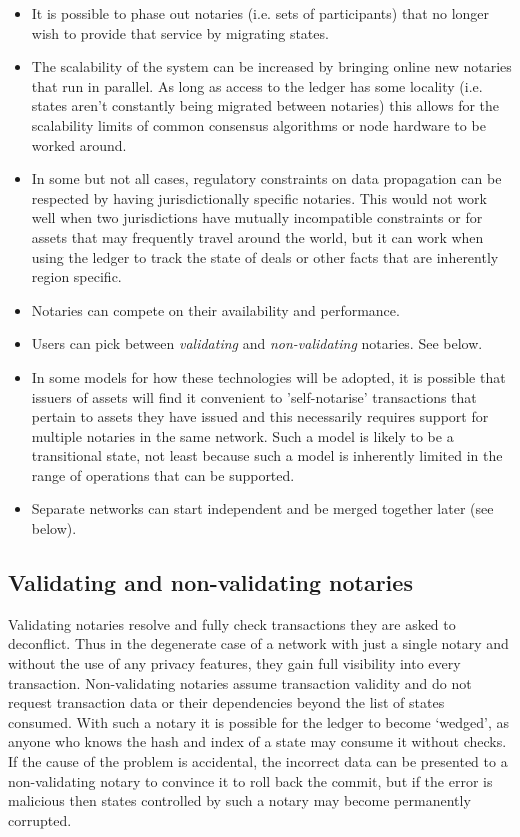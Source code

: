 \documentclass{article}
\begin{document}
\begin{itemize}
\item It is possible to phase out notaries (i.e. sets of participants) that no longer wish to provide that service by
migrating states.
\item The scalability of the system can be increased by bringing online new notaries that run in parallel. As long
as access to the ledger has some locality (i.e. states aren't constantly being migrated between notaries) this
allows for the scalability limits of common consensus algorithms or node hardware to be worked around.
\item In some but not all cases, regulatory constraints on data propagation can be respected by having
jurisdictionally specific notaries. This would not work well when two jurisdictions have mutually incompatible
constraints or for assets that may frequently travel around the world, but it can work when using the ledger to
track the state of deals or other facts that are inherently region specific.
\item Notaries can compete on their availability and performance.
\item Users can pick between \emph{validating} and \emph{non-validating} notaries. See below.
\item In some models for how these technologies will be adopted, it is possible that issuers of assets will find it
convenient to 'self-notarise' transactions that pertain to assets they have issued and this necessarily requires
support for multiple notaries in the same network. Such a model is likely to be a transitional state, not least
because such a model is inherently limited in the range of operations that can be supported.
\item Separate networks can start independent and be merged together later (see below).
\end{itemize}

\subsection{Validating and non-validating notaries}\label{sec:non-validating-notaries}

Validating notaries resolve and fully check transactions they are asked to deconflict. Thus in the degenerate case
of a network with just a single notary and without the use of any privacy features, they gain full visibility into
every transaction. Non-validating notaries assume transaction validity and do not request transaction data or their
dependencies beyond the list of states consumed. With such a notary it is possible for the ledger to become
`wedged', as anyone who knows the hash and index of a state may consume it without checks. If the cause of the
problem is accidental, the incorrect data can be presented to a non-validating notary to convince it to roll back
the commit, but if the error is malicious then states controlled by such a notary may become permanently corrupted.
\end{document}
